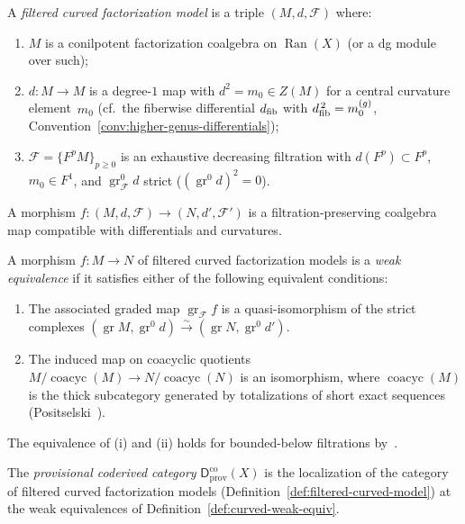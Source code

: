 \begin{definition}
\label{def:filtered-curved-model}
A \emph{filtered curved factorization model} is a triple
$(M, d, \mathcal{F})$ where:
\begin{enumerate}[label=\textup{(\roman*)}]
\item $M$ is a conilpotent factorization coalgebra on $\operatorname{Ran}(X)$
  (or a dg module over such);
\item $d \colon M \to M$ is a degree-$1$ map with
  $d^2 = m_0 \in Z(M)$ for a central curvature element~$m_0$
  (cf.\ the fiberwise differential $d_{\mathrm{fib}}$ with $d_{\mathrm{fib}}^{\,2} = m_0^{(g)}$,
  Convention~\textup{\ref{conv:higher-genus-differentials}});
\item $\mathcal{F} = \{F^p M\}_{p \geq 0}$ is an exhaustive
  decreasing filtration with $d(F^p) \subset F^p$,
  $m_0 \in F^1$, and $\operatorname{gr}^0_{\mathcal{F}} d$ strict
  ($(\operatorname{gr}^0 d)^2 = 0$).
\end{enumerate}
A morphism $f \colon (M, d, \mathcal{F}) \to (N, d', \mathcal{F}')$ is a
filtration-preserving coalgebra map compatible with differentials and curvatures.
\end{definition}

\begin{definition}
\label{def:curved-weak-equiv}
A morphism $f \colon M \to N$ of filtered curved factorization models
is a \emph{weak equivalence} if it satisfies either of the following
equivalent conditions:
\begin{enumerate}[label=\textup{(\roman*)}]
\item The associated graded map
  $\operatorname{gr}_{\mathcal{F}} f$ is a quasi-isomorphism of the
  strict complexes $(\operatorname{gr} M, \operatorname{gr}^0 d)
  \xrightarrow{\sim} (\operatorname{gr} N, \operatorname{gr}^0 d')$.
\item The induced map on coacyclic quotients
  $M/\operatorname{coacyc}(M) \to N/\operatorname{coacyc}(N)$ is an
  isomorphism, where $\operatorname{coacyc}(M)$ is the thick subcategory
  generated by totalizations of short exact sequences
  (Positselski~\cite{Positselski11}).
\end{enumerate}
The equivalence of (i) and (ii) holds for bounded-below filtrations
by~\cite[Proposition~3.5]{Positselski11}.
\end{definition}

\begin{definition}
\label{def:provisional-coderived}
The \emph{provisional coderived category} $\mathsf{D}^{\mathrm{co}}_{\mathrm{prov}}(X)$
is the localization of the category of filtered curved factorization
models (Definition~\ref{def:filtered-curved-model}) at the weak
equivalences of Definition~\ref{def:curved-weak-equiv}.
\end{definition}

